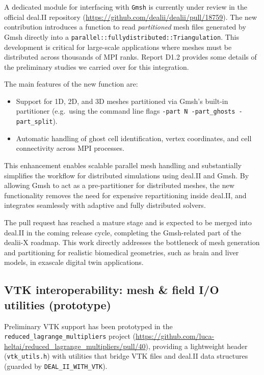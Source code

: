 \documentclass[a4paper,12pt]{article}
\begin{document}
A dedicated module for interfacing with \texttt{Gmsh} is currently under
review in the official deal.II repository
(\url{https://github.com/dealii/dealii/pull/18759}).  
The new contribution introduces a function to read \emph{partitioned} mesh files
generated by Gmsh directly into a \texttt{parallel::fullydistributed::Triangulation}.
This development is critical for large-scale applications where meshes must be
distributed across thousands of MPI ranks. Report D1.2 provides some details of the preliminary studies we carried over for this integration.

The main features of the new function are:
\begin{itemize}
  \item Support for 1D, 2D, and 3D meshes partitioned via Gmsh's built-in
        partitioner (e.g.\ using the command line flags
        \verb|-part N -part_ghosts -part_split|).
  \item Automatic handling of ghost cell identification, vertex coordinates,
        and cell connectivity across MPI processes.
\end{itemize}

This enhancement enables scalable parallel mesh handling and substantially
simplifies the workflow for distributed simulations using deal.II and Gmsh.
By allowing Gmsh to act as a pre-partitioner for distributed meshes, the new
functionality removes the need for expensive repartitioning inside deal.II,
and integrates seamlessly with adaptive and fully distributed solvers.  

The pull request has reached a mature stage and is expected to be merged into
deal.II in the coming release cycle, completing the Gmsh-related part of the
dealii-X roadmap. This work directly addresses the bottleneck of mesh generation
and partitioning for realistic biomedical geometries, such as brain and liver
models, in exascale digital twin applications.

\subsection{VTK interoperability: mesh \& field I/O utilities (prototype)}
Preliminary VTK support has been prototyped in the \texttt{reduced\_lagrange\_multipliers}
project (\url{https://github.com/luca-heltai/reduced_lagrange_multipliers/pull/40}),
providing a lightweight header (\texttt{vtk\_utils.h}) with utilities that bridge
VTK files and deal.II data structures (guarded by \texttt{DEAL\_II\_WITH\_VTK}).
\end{document}
